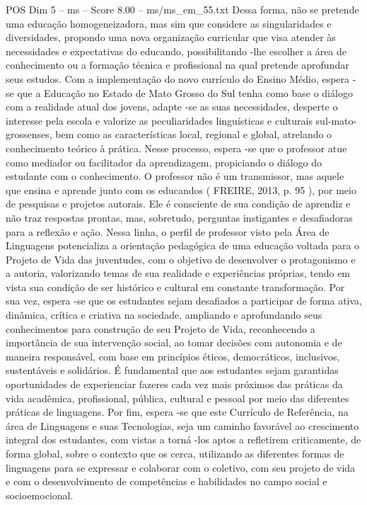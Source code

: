 \begin{textsample}{POS Dim 5 – ms – Score 8.00 – ms/ms\_em\_55.txt}
Dessa forma, não se pretende uma educação homogeneizadora, mas sim que considere as singularidades e diversidades, propondo uma nova organização curricular que visa atender às necessidades e expectativas do educando, possibilitando -lhe escolher a área de conhecimento ou a formação técnica e profissional na qual pretende aprofundar seus estudos.
Com a implementação do novo currículo do Ensino Médio, espera -se que a Educação no Estado de Mato Grosso do Sul tenha como base o diálogo com a realidade atual dos jovens, adapte -se as suas necessidades, desperte o interesse pela escola e valorize as peculiaridades linguísticas e culturais sul-mato-grossenses, bem como as características local, regional e global, atrelando o conhecimento teórico à prática.
Nesse processo, espera -se que o professor atue como mediador ou facilitador da aprendizagem, propiciando o diálogo do estudante com o conhecimento.
O professor não é um transmissor, mas aquele que ensina e aprende junto com os educandos ( FREIRE, 2013, p. 95 ), por meio de pesquisas e projetos autorais.
Ele é consciente de sua condição de aprendiz e não traz respostas prontas, mas, sobretudo, perguntas instigantes e desafiadoras para a reflexão e ação.
Nessa linha, o perfil de professor visto pela Área de Linguagens potencializa a orientação pedagógica de uma educação voltada para o Projeto de Vida das juventudes, com o objetivo de desenvolver o protagonismo e a autoria, valorizando temas de sua realidade e experiências próprias, tendo em vista sua condição de ser histórico e cultural em constante transformação.
Por sua vez, espera -se que os estudantes sejam desafiados a participar de forma ativa, dinâmica, crítica e criativa na sociedade, ampliando e aprofundando seus conhecimentos para construção de seu Projeto de Vida, reconhecendo a importância de sua intervenção social, ao tomar decisões com autonomia e de maneira responsável, com base em princípios éticos, democráticos, inclusivos, sustentáveis e solidários.
É fundamental que aos estudantes sejam garantidas oportunidades de experienciar fazeres cada vez mais próximos das práticas da vida acadêmica, profissional, pública, cultural e pessoal por meio das diferentes práticas de linguagens.
Por fim, espera -se que este Currículo de Referência, na área de Linguagens e suas Tecnologias, seja um caminho favorável ao crescimento integral dos estudantes, com vistas a torná -los aptos a refletirem criticamente, de forma global, sobre o contexto que os cerca, utilizando as diferentes formas de linguagens para se expressar e colaborar com o coletivo, com seu projeto de vida e com o desenvolvimento de competências e habilidades no campo social e socioemocional.

\end{textsample}
